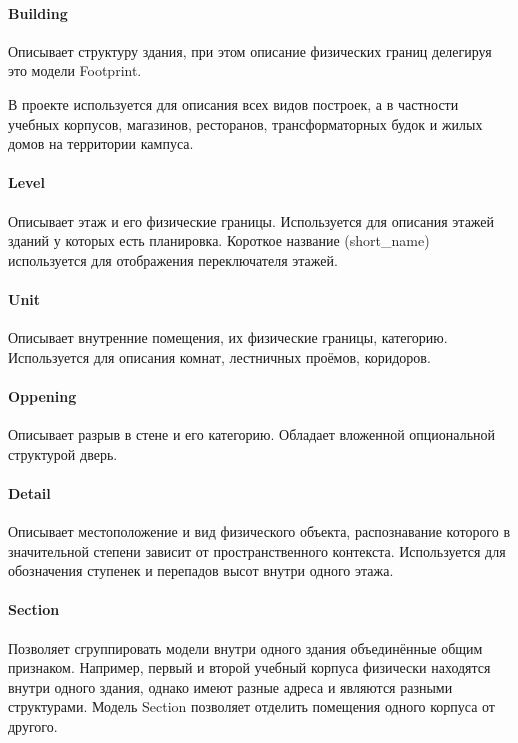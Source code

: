         \paragraph{Building}
          Описывает структуру здания, при этом описание физических границ делегируя это модели Footprint.

          В проекте используется для описания всех видов построек, а в частности учебных корпусов, магазинов, ресторанов, трансформаторных будок и жилых домов на территории кампуса.

        \paragraph{Level}
          Описывает этаж и его физические границы. Используется для описания этажей зданий у которых есть планировка. Короткое название (short\_name) используется для отображения переключателя этажей.

        \paragraph{Unit}
          Описывает внутренние помещения, их физические границы, категорию. Используется для описания комнат, лестничных проёмов, коридоров.

        \paragraph{Oppening}
          Описывает разрыв в стене и его категорию. Обладает вложенной опциональной структурой дверь.

        \paragraph{Detail}
          Описывает местоположение и вид физического объекта, распознавание которого в значительной степени зависит от пространственного контекста. Используется для обозначения ступенек и перепадов высот внутри одного этажа.

        \paragraph{Section}
          Позволяет сгруппировать модели внутри одного здания объединённые общим признаком. Например, первый и второй учебный корпуса физически находятся внутри одного здания, однако имеют разные адреса и являются разными структурами. Модель Section позволяет отделить помещения одного корпуса от другого.

